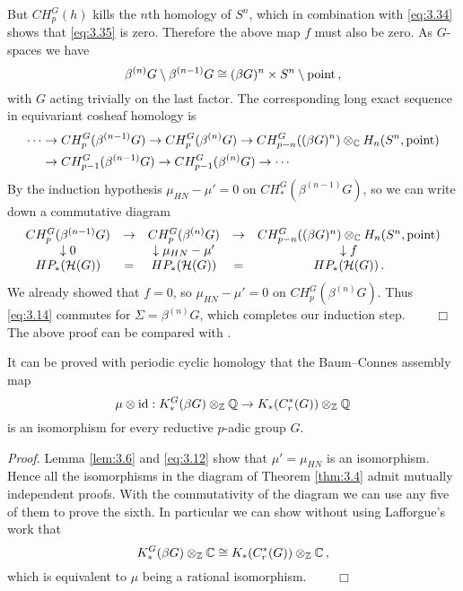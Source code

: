 But $CH_p^G (h)$ kills the $n$th homology of $S^n$, which in combination with \eqref{eq:3.34}
shows that \eqref{eq:3.35} is zero. Therefore the above map $f$ must also be zero.
As $G$-spaces we have 
\[
\beta^{(n)} G \setminus \beta^{(n-1)} G \cong 
(\beta G)^n \times S^n \setminus \mathrm{point} \,,
\]
with $G$ acting trivially on the last factor. The corresponding long exact sequence in
equivariant cosheaf homology is
\[
\begin{split}
\cdots & \to CH_p^G ( \beta^{(n-1)} G ) \to CH_p^G ( \beta^{(n)} G ) \to
CH_{p-n}^G ((\beta G)^n ) \otimes_{\mathbb C} H_n (S^n ,\mathrm{point}) \\
& \to CH_{p-1}^G (\beta^{(n-1)} G ) \to CH_{p-1}^G ( \beta^{(n)} G ) \to \cdots
\end{split}
\]
By the induction hypothesis $\mu_{HN} - \mu' = 0$ on $CH_*^G ( \beta^{(n-1)} G )$, so
we can write down a commutative diagram
\[
\begin{array}{ccccc}
CH_p^G ( \beta^{(n-1)} G) & \to & CH_p^G (\beta^{(n)} G) & \to &
CH_{p-n}^G ((\beta G)^n ) \otimes_{\mathbb C} H_n (S^n ,\mathrm{point}) \\
\downarrow 0 & & \downarrow \mu_{HN} - \mu' & & \downarrow f \\
HP_* (\mathcal H (G)) & = & HP_* (\mathcal H (G)) & = & HP_* (\mathcal H (G)) \,. \\
\end{array}
\]
We already showed that $f = 0$, so $\mu_{HN} - \mu' = 0$ on $CH_p^G (\beta^{(n)} G)$.
Thus \eqref{eq:3.14} commutes for $\Sigma = \beta^{(n)} G$, which completes our induction 
step. $\qquad \Box$
\\[2mm]

The above proof can be compared with \cite[Section 5.1]{Mey1}.

\begin{cor}\label{cor:3.7}
It can be proved with periodic cyclic homology that the Baum--Connes assembly map
\[
\mu \otimes \mathrm{id} : K_*^G (\beta G) \otimes_{\mathbb Z} \mathbb Q \to 
K_* (C_r^* (G)) \otimes_{\mathbb Z} \mathbb Q
\]
is an isomorphism for every reductive $p$-adic group $G$.
\end{cor}
\emph{Proof.}
Lemma \ref{lem:3.6} and \eqref{eq:3.12} show that $\mu' = \mu_{HN}$ is an 
isomorphism. Hence all the isomorphisms in the diagram of Theorem 
\ref{thm:3.4} admit mutually independent proofs. With the commutativity of
the diagram we can use any five of them to prove the sixth. 
In particular we can show without using Lafforgue's work that 
\[
K^G_* (\beta G) \otimes_{\mathbb Z} \mathbb C \cong 
K_* (C_r^* (G)) \otimes_{\mathbb Z} \mathbb C \,,
\]
which is equivalent to $\mu$ being a rational isomorphism. $\qquad \Box$









